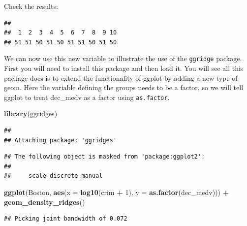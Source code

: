 \documentclass[]{book}
\newenvironment{Shaded}{\begin{snugshade}}{\end{snugshade}}
\newcommand{\DataTypeTok}[1]{\textcolor[rgb]{0.13,0.29,0.53}{#1}}
\newcommand{\DecValTok}[1]{\textcolor[rgb]{0.00,0.00,0.81}{#1}}
\newcommand{\KeywordTok}[1]{\textcolor[rgb]{0.13,0.29,0.53}{\textbf{#1}}}
\newcommand{\NormalTok}[1]{#1}
\newcommand{\OperatorTok}[1]{\textcolor[rgb]{0.81,0.36,0.00}{\textbf{#1}}}
\newcommand{\StringTok}[1]{\textcolor[rgb]{0.31,0.60,0.02}{#1}}
\theoremstyle{definition}
\theoremstyle{definition}
\theoremstyle{definition}
\theoremstyle{remark}
\begin{document}
Check the results:

\begin{Shaded}
\end{Shaded}

\begin{verbatim}
## 
##  1  2  3  4  5  6  7  8  9 10 
## 51 51 50 51 50 51 51 50 51 50
\end{verbatim}

We can now use this new variable to illustrate the use of the
\texttt{ggridge} package. First you will need to install this package
and then load it. You will see all this package does is to extend the
functionality of ggplot by adding a new type of geom. Here the variable
defining the groups needs to be a factor, so we will tell ggplot to
treat dec\_medv as a factor using \texttt{as.factor}.

\begin{Shaded}
\begin{Highlighting}[]
\KeywordTok{library}\NormalTok{(ggridges)}
\end{Highlighting}
\end{Shaded}

\begin{verbatim}
## 
## Attaching package: 'ggridges'
\end{verbatim}

\begin{verbatim}
## The following object is masked from 'package:ggplot2':
## 
##     scale_discrete_manual
\end{verbatim}

\begin{Shaded}
\begin{Highlighting}[]
\KeywordTok{ggplot}\NormalTok{(Boston, }\KeywordTok{aes}\NormalTok{(}\DataTypeTok{x =} \KeywordTok{log10}\NormalTok{(crim }\OperatorTok{+}\StringTok{ }\DecValTok{1}\NormalTok{), }\DataTypeTok{y =} \KeywordTok{as.factor}\NormalTok{(dec_medv))) }\OperatorTok{+}\StringTok{ }\KeywordTok{geom_density_ridges}\NormalTok{()}
\end{Highlighting}
\end{Shaded}

\begin{verbatim}
## Picking joint bandwidth of 0.072
\end{verbatim}
\end{document}
